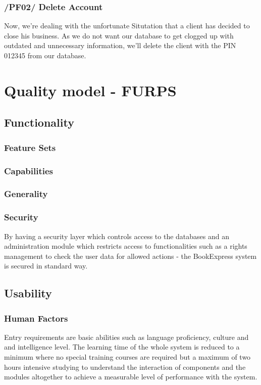 \documentclass[11pt,a4paper,oneside,svgnames]{report}
\begin{document}
\subsection{/PF02/ Delete Account}
Now, we're dealing with the unfortunate Situtation that a client has decided to close his business. As we do not want our database to get clogged up with outdated and unnecessary information, we'll delete the client with the PIN 012345 from our database.
\subsection{}

\chapter{Quality model - FURPS}

\section{Functionality}

\subsection{Feature Sets}

\subsection{Capabilities}

\subsection{Generality}

\subsection{Security}
By having a security layer which controls access to the databases and an administration module which restricts access to functionalities such as a rights management to check the user data for allowed actions - the BookExpress system is secured in standard way.

\section{Usability}

\subsection{Human Factors}
Entry requirements are basic abilities such as language proficiency, culture and and intelligence level. The learning time of the whole system is reduced to a minimum where no special training courses are required but a maximum of two hours intensive studying to understand the interaction of components and the modules altogether to achieve a measurable level of performance with the system.
\end{document}
